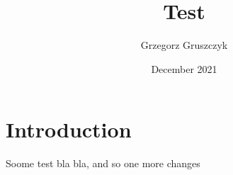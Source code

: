 \documentclass{article}
\title{Test}
\author{Grzegorz Gruszczyk}
\date{December 2021}
\begin{document}
\maketitle

\section{Introduction}
Soome test bla bla, and so one more changes
\end{document}
